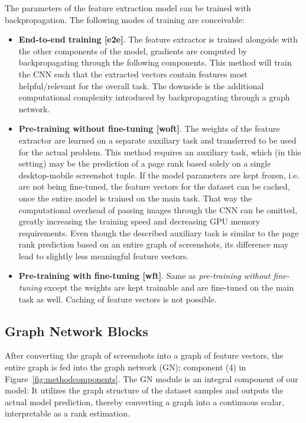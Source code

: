 The parameters of the feature extraction model can be trained with backpropagation. The following modes of training are conceivable:
\begin{itemize}
    \item \textbf{End-to-end training [e2e]}. The feature extractor is trained alongside with the other components of the model, gradients are computed by backpropagating through the following components. This method will train the CNN such that the extracted vectors contain features most helpful/relevant for the overall task. The downside is the additional computational complexity introduced by backpropagating through a graph network.
    \item \textbf{Pre-training without fine-tuning [woft]}. The weights of the feature extractor are learned on a separate auxiliary task and transferred to be used for the actual problem. This method requires an auxiliary task, which (in this setting) may be the prediction of a page rank based solely on a single desktop-mobile screenshot tuple. If the model parameters are kept frozen, i.e. are not being fine-tuned, the feature vectors for the dataset can be cached, once the entire model is trained on the main task. That way the computational overhead of passing images through the CNN can be omitted, greatly increasing the training speed and decreasing GPU memory requirements. Even though the described auxiliary task is similar to the page rank prediction based on an entire graph of screenshots, its difference may lead to slightly less meaningful feature vectors.
    \item \textbf{Pre-training with fine-tuning [wft]}. Same as \textit{pre-training without fine-tuning} except the weights are kept trainable and are fine-tuned on the main task as well. Caching of feature vectors is not possible.
\end{itemize}

\subsection{Graph Network Blocks}
\label{sec:gnblocks}

After converting the graph of screenshots into a graph of feature vectors, the entire graph is fed into the graph network (GN); component (4) in Figure~\ref{fig:methodcomponents}. The GN module is an integral component of our model: It utilizes the graph structure of the dataset samples and outputs the actual model prediction, thereby converting a graph into a continuous scalar, interpretable as a rank estimation.

